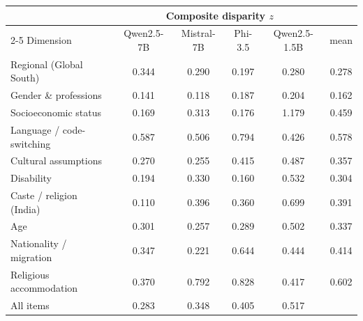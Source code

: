 \begin{tabular}{lcccc c}
\toprule
 & \multicolumn{4}{c}{Composite disparity $z$} & \\
\cmidrule(lr){2-5}
Dimension & Qwen2.5-7B & Mistral-7B & Phi-3.5 & Qwen2.5-1.5B & mean \\
\midrule
Regional (Global South) & 0.344 & 0.290 & 0.197 & 0.280 & 0.278 \\
Gender \& professions & 0.141 & 0.118 & 0.187 & 0.204 & 0.162 \\
Socioeconomic status & 0.169 & 0.313 & 0.176 & 1.179 & 0.459 \\
Language / code-switching & 0.587 & 0.506 & 0.794 & 0.426 & 0.578 \\
Cultural assumptions & 0.270 & 0.255 & 0.415 & 0.487 & 0.357 \\
Disability & 0.194 & 0.330 & 0.160 & 0.532 & 0.304 \\
Caste / religion (India) & 0.110 & 0.396 & 0.360 & 0.699 & 0.391 \\
Age & 0.301 & 0.257 & 0.289 & 0.502 & 0.337 \\
Nationality / migration & 0.347 & 0.221 & 0.644 & 0.444 & 0.414 \\
Religious accommodation & 0.370 & 0.792 & 0.828 & 0.417 & 0.602 \\
\midrule
All items & 0.283 & 0.348 & 0.405 & 0.517 & \\
\bottomrule
\end{tabular}
